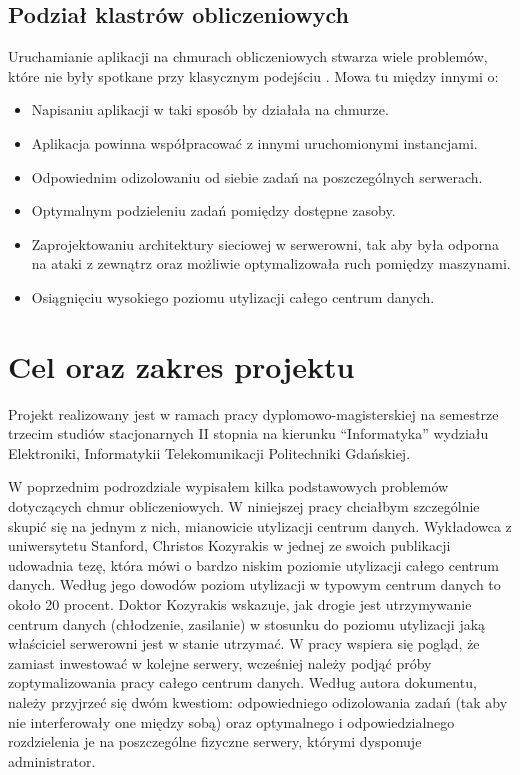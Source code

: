 \documentclass[10pt,a4paper,titlepage,twoside]{report}
\begin{document}
\subsection{Podział klastrów obliczeniowych}\indent \indent Uruchamianie aplikacji na chmurach obliczeniowych stwarza wiele problemów, które nie były spotkane przy klasycznym podejściu \cite{ad14}. Mowa tu między innymi o:
\begin{itemize}
	\item Napisaniu aplikacji w taki sposób by działała na chmurze.
	\item Aplikacja powinna współpracować z innymi uruchomionymi instancjami.
	\item Odpowiednim odizolowaniu od siebie zadań na poszczególnych serwerach.
	\item Optymalnym podzieleniu zadań pomiędzy dostępne zasoby.
	\item Zaprojektowaniu architektury sieciowej w serwerowni, tak aby była odporna na ataki z zewnątrz oraz możliwie optymalizowała ruch pomiędzy maszynami.
	\item Osiągnięciu wysokiego poziomu utylizacji całego centrum danych.
\end{itemize}

\section{Cel oraz zakres projektu}
\indent \indent Projekt realizowany jest w ramach pracy dyplomowo-magisterskiej na semestrze trzecim studiów stacjonarnych II stopnia na kierunku “Informatyka” wydziału Elektroniki, Informatykii Telekomunikacji Politechniki Gdańskiej.

W poprzednim podrozdziale wypisałem kilka podstawowych problemów dotyczących chmur obliczeniowych. W niniejszej pracy chciałbym szczególnie skupić się na jednym z nich, mianowicie utylizacji centrum danych. Wykładowca z uniwersytetu Stanford, Christos Kozyrakis w jednej ze swoich publikacji \cite{ad3} udowadnia tezę, która mówi o bardzo niskim poziomie utylizacji całego centrum danych. Według jego dowodów poziom utylizacji w typowym centrum danych to około 20 procent. Doktor Kozyrakis wskazuje, jak drogie jest utrzymywanie centrum danych (chłodzenie, zasilanie) w stosunku do poziomu utylizacji jaką właściciel serwerowni jest w stanie utrzymać. W pracy wspiera się pogląd, że zamiast inwestować w kolejne serwery, wcześniej należy podjąć próby zoptymalizowania pracy całego centrum danych. Według autora dokumentu, należy przyjrzeć się dwóm kwestiom: odpowiedniego odizolowania zadań (tak aby nie interferowały one między sobą) oraz optymalnego i odpowiedzialnego rozdzielenia je na poszczególne fizyczne serwery, którymi dysponuje administrator.
\end{document}

